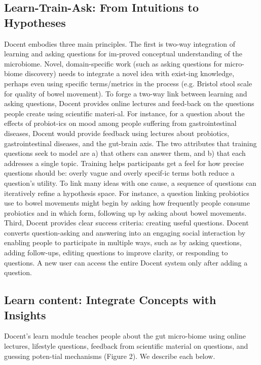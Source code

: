 \subsection{Learn-Train-Ask: From Intuitions to Hypotheses}
Docent embodies three main principles. The first is two-way integration of learning and asking questions for im-proved conceptual understanding of the microbiome. Novel, domain-specific work (such as asking questions for micro-biome discovery) needs to integrate a novel idea with exist-ing knowledge, perhaps even using specific terms/metrics in the process (e.g. Bristol stool scale for quality of bowel movement). To forge a two-way link between learning and asking questions, Docent provides online lectures and feed-back on the questions people create using scientific materi-al. For instance, for a question about the effects of probiot-ics on mood among people suffering from gastrointestinal diseases, Docent would provide feedback using lectures about probiotics, gastrointestinal diseases, and the gut-brain axis.
The two attributes that training questions seek to model are a) that others can answer them, and b) that each addresses a single topic. Training helps participants get a feel for how precise questions should be: overly vague and overly specif-ic terms both reduce a question’s utility. To link many ideas with one cause, a sequence of questions can iteratively refine a hypothesis space. For instance, a question linking probiotics use to bowel movements might begin by asking how frequently people consume probiotics and in which form, following up by asking about bowel movements.
Third, Docent provides clear success criteria: creating useful questions. Docent converts question-asking and answering into an engaging social interaction by enabling people to participate in multiple ways, such as by asking questions, adding follow-ups, editing questions to improve clarity, or responding to questions. A new user can access the entire Docent system only after adding a question. 

\subsection{Learn content: Integrate Concepts with Insights}
Docent’s learn module teaches people about the gut micro-biome using online lectures, lifestyle questions, feedback from scientific material on questions, and guessing poten-tial mechanisms (Figure 2). We describe each below. 

